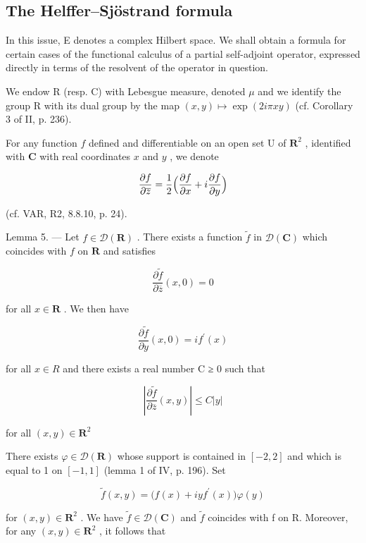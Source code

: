 \subsection{The Helffer--Sjöstrand formula}

In this issue, E denotes a complex Hilbert space. We shall obtain a formula for certain cases of the functional calculus of a partial self-adjoint operator, expressed directly in terms of the resolvent of the operator in question.

We endow R (resp. C) with Lebesgue measure, denoted \(\mu\) and we identify the group R with its dual group by the map \((x,y)\mapsto\exp(2i\pi xy)\) (cf. Corollary 3 of II, p. 236).

For any function \(f\) defined and differentiable on an open set U of \(\mathbf{R}^{2}\) , identified with \(\mathbf{C}\) with real coordinates \(x\) and \(y\) , we denote

\[
{\frac {\partial f}{\partial \overline {{{z}}}}} = {\frac {1}{2}} {\Bigl (} {\frac {\partial f}{\partial x}} + i {\frac {\partial f}{\partial y}} {\Bigr)}
\]

(cf. VAR, R2, 8.8.10, p. 24).

Lemma 5. --- Let \(f \in \mathcal{D}(\mathbf{R})\) . There exists a function \(\tilde{f}\) in \(\mathcal{D}(\mathbf{C})\) which coincides with \(f\) on \(\mathbf{R}\) and satisfies

\[
\frac {\partial \widetilde {f}}{\partial \overline {{z}}} (x, 0) = 0\tag{11}
\]

for all \(x \in \mathbf{R}\) . We then have

\[
\frac {\partial \widetilde {f}}{\partial y} (x, 0) = i f ^ {\prime} (x)\tag{12}
\]

for all \(x \in R\) and there exists a real number C ≥ 0 such that

\[
\left| \frac {\partial \widetilde {f}}{\partial \overline {{z}}} (x, y) \right| \leqslant C | y |\tag{13}
\]

for all \((x,y)\in \mathbf{R}^2\)

There exists \(\varphi\in\mathcal{D}(\mathbf{R})\) whose support is contained in \([-2,2]\) and which is equal to 1 on \([-1,1]\) (lemma 1 of IV, p. 196). Set

\[
\widetilde {f} (x, y) = \bigl (f (x) + i y f ^ {\prime} (x) \bigr) \varphi (y)
\]

for \((x,y)\in\mathbf{R}^{2}\) . We have \(\widetilde{f}\in\mathcal{D}(\mathbf{C})\) and \(\widetilde{f}\) coincides with f on R. Moreover, for any \((x,y)\in\mathbf{R}^{2}\) , it follows that

